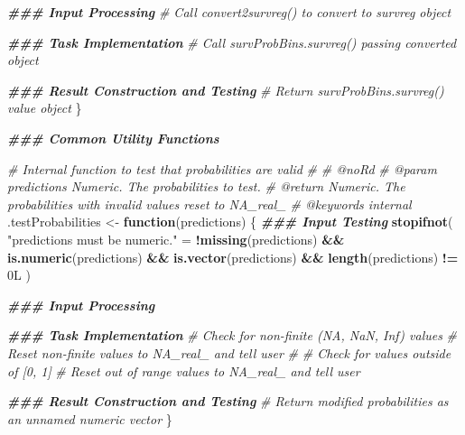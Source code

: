 \documentclass[
]{book}
\newenvironment{Shaded}{\begin{snugshade}}{\end{snugshade}}
\newcommand{\CommentTok}[1]{\textcolor[rgb]{0.56,0.35,0.01}{\textit{#1}}}
\newcommand{\ControlFlowTok}[1]{\textcolor[rgb]{0.13,0.29,0.53}{\textbf{#1}}}
\newcommand{\DocumentationTok}[1]{\textcolor[rgb]{0.56,0.35,0.01}{\textbf{\textit{#1}}}}
\newcommand{\FunctionTok}[1]{\textcolor[rgb]{0.13,0.29,0.53}{\textbf{#1}}}
\newcommand{\NormalTok}[1]{#1}
\newcommand{\OtherTok}[1]{\textcolor[rgb]{0.56,0.35,0.01}{#1}}
\newcommand{\SpecialCharTok}[1]{\textcolor[rgb]{0.81,0.36,0.00}{\textbf{#1}}}
\newcommand{\StringTok}[1]{\textcolor[rgb]{0.31,0.60,0.02}{#1}}
\begin{document}
\begin{Shaded}
\begin{Highlighting}[]
  \DocumentationTok{\#\#\# Input Processing}
  \CommentTok{\# Call convert2survreg() to convert to \textasciigrave{}survreg\textasciigrave{} object}
  
  \DocumentationTok{\#\#\# Task Implementation}
  \CommentTok{\# Call survProbBins.survreg() passing converted object}
  
  \DocumentationTok{\#\#\# Result Construction and Testing}
  \CommentTok{\# Return \textasciigrave{}survProbBins.survreg()\textasciigrave{} value object}
\NormalTok{\}}

\DocumentationTok{\#\#\# Common Utility Functions}

\CommentTok{\#\textquotesingle{} Internal function to test that probabilities are valid}
\CommentTok{\#\textquotesingle{} }
\CommentTok{\#\textquotesingle{} @noRd}
\CommentTok{\#\textquotesingle{} @param predictions Numeric. The probabilities to test.}
\CommentTok{\#\textquotesingle{} @return Numeric. The probabilities with invalid values reset to NA\_real\_}
\CommentTok{\#\textquotesingle{} @keywords internal}
\NormalTok{.testProbabilities }\OtherTok{\textless{}{-}} \ControlFlowTok{function}\NormalTok{(predictions) \{}
  \DocumentationTok{\#\#\# Input Testing}
  \FunctionTok{stopifnot}\NormalTok{(}
    \StringTok{"\textasciigrave{}predictions\textasciigrave{} must be numeric."} \OtherTok{=} 
      \SpecialCharTok{!}\FunctionTok{missing}\NormalTok{(predictions) }\SpecialCharTok{\&\&} \FunctionTok{is.numeric}\NormalTok{(predictions) }\SpecialCharTok{\&\&} 
      \FunctionTok{is.vector}\NormalTok{(predictions) }\SpecialCharTok{\&\&} \FunctionTok{length}\NormalTok{(predictions) }\SpecialCharTok{!=}\NormalTok{ 0L}
\NormalTok{  )}
  
  \DocumentationTok{\#\#\# Input Processing}
  
  \DocumentationTok{\#\#\# Task Implementation}
  \CommentTok{\# Check for non{-}finite (NA, NaN, Inf) values}
  \CommentTok{\# Reset non{-}finite values to NA\_real\_ and tell user}
  \CommentTok{\#}
  \CommentTok{\# Check for values outside of [0, 1]}
  \CommentTok{\# Reset out of range values to NA\_real\_ and tell user}
  
  \DocumentationTok{\#\#\# Result Construction and Testing}
  \CommentTok{\# Return modified probabilities as an unnamed numeric vector}
\NormalTok{\}}


\end{Highlighting}
\end{Shaded}
\end{document}
